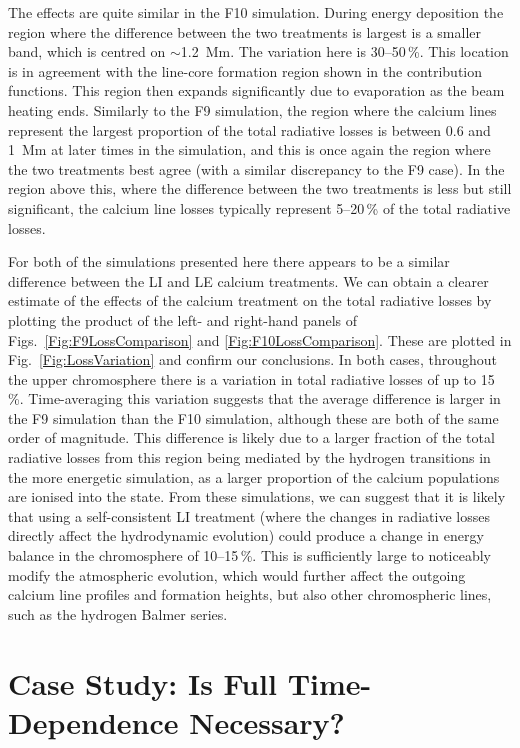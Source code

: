 The effects are quite similar in the F10 simulation.
During energy deposition the region where the difference between the two treatments is largest is a smaller band, which is centred on $\sim$\SI{1.2}{\mega\metre}.
The variation here is 30--50\,\%.
This location is in agreement with the line-core formation region shown in the contribution functions.
This region then expands significantly due to evaporation as the beam heating ends.
Similarly to the F9 simulation, the region where the calcium lines represent the largest proportion of the total radiative losses is between 0.6 and \SI{1}{\mega\metre} at later times in the simulation, and this is once again the region where the two treatments best agree (with a similar discrepancy to the F9 case).
In the region above this, where the difference between the two treatments is less but still significant, the calcium line losses typically represent 5--20\,\% of the total radiative losses.

For both of the simulations presented here there appears to be a similar difference between the LI and LE calcium treatments.
We can obtain a clearer estimate of the effects of the calcium treatment on the total radiative losses by plotting the product of the left- and right-hand panels of Figs.~\ref{Fig:F9LossComparison} and \ref{Fig:F10LossComparison}.
These are plotted in Fig.~\ref{Fig:LossVariation} and confirm our conclusions.
In both cases, throughout the upper chromosphere there is a variation in total radiative losses of up to 15\,\%.
Time-averaging this variation suggests that the average difference is larger in the F9 simulation than the F10 simulation, although these are both of the same order of magnitude.
This difference is likely due to a larger fraction of the total radiative losses from this region being mediated by the hydrogen transitions in the more energetic simulation, as a larger proportion of the calcium populations are ionised into the \Caiii{} state.
From these simulations, we can suggest that it is likely that using a self-consistent LI treatment (where the changes in radiative losses directly affect the hydrodynamic evolution) could produce a change in energy balance in the chromosphere of 10--15\,\%.
This is sufficiently large to noticeably modify the atmospheric evolution, which would further affect the outgoing calcium line profiles and formation heights, but also other chromospheric lines, such as the hydrogen Balmer series.


\section{Case Study: Is Full Time-Dependence Necessary?}\label{Sec:TimeDepSE}

